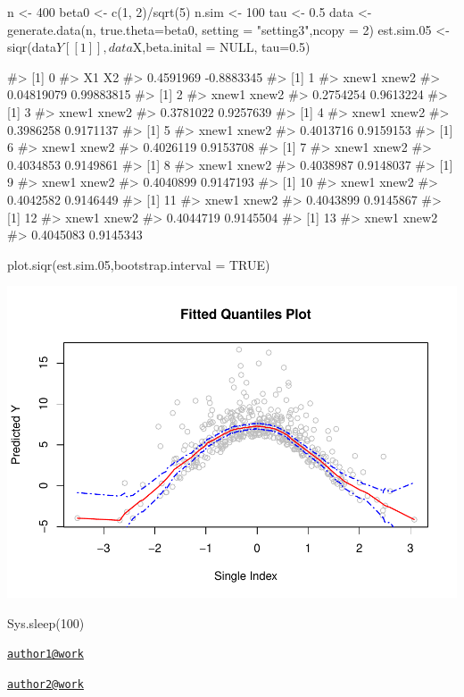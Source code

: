 \begin{Schunk}
\begin{Sinput}
n <- 400
beta0 <- c(1, 2)/sqrt(5)
n.sim <- 100
tau <- 0.5
data <- generate.data(n, true.theta=beta0, setting = "setting3",ncopy = 2)
est.sim.05 <- siqr(data$Y[[1]],data$X,beta.inital = NULL, tau=0.5)
\end{Sinput}
\begin{Soutput}
#> [1] 0
#>         X1         X2 
#>  0.4591969 -0.8883345 
#> [1] 1
#>      xnew1      xnew2 
#> 0.04819079 0.99883815 
#> [1] 2
#>     xnew1     xnew2 
#> 0.2754254 0.9613224 
#> [1] 3
#>     xnew1     xnew2 
#> 0.3781022 0.9257639 
#> [1] 4
#>     xnew1     xnew2 
#> 0.3986258 0.9171137 
#> [1] 5
#>     xnew1     xnew2 
#> 0.4013716 0.9159153 
#> [1] 6
#>     xnew1     xnew2 
#> 0.4026119 0.9153708 
#> [1] 7
#>     xnew1     xnew2 
#> 0.4034853 0.9149861 
#> [1] 8
#>     xnew1     xnew2 
#> 0.4038987 0.9148037 
#> [1] 9
#>     xnew1     xnew2 
#> 0.4040899 0.9147193 
#> [1] 10
#>     xnew1     xnew2 
#> 0.4042582 0.9146449 
#> [1] 11
#>     xnew1     xnew2 
#> 0.4043899 0.9145867 
#> [1] 12
#>     xnew1     xnew2 
#> 0.4044719 0.9145504 
#> [1] 13
#>     xnew1     xnew2 
#> 0.4045083 0.9145343
\end{Soutput}
\begin{Sinput}
plot.siqr(est.sim.05,bootstrap.interval = TRUE)
\end{Sinput}

\includegraphics{siqr_files/figure-latex/unnamed-chunk-15-1} \end{Schunk}

\begin{Schunk}
\begin{Sinput}
Sys.sleep(100)
\end{Sinput}
\end{Schunk}




\address{%
Author One\\
Affiliation\\
line 1\\ line 2\\
}
\href{mailto:author1@work}{\nolinkurl{author1@work}}

\address{%
Author Two\\
Affiliation\\
line 1\\ line 2\\
}
\href{mailto:author2@work}{\nolinkurl{author2@work}}

